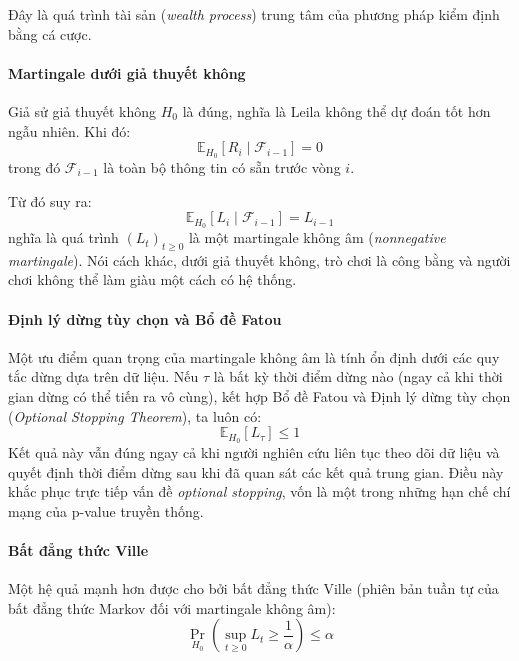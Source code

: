 Đây là quá trình tài sản (\textit{wealth process}) trung tâm của phương pháp kiểm định bằng cá cược.

\paragraph{Martingale dưới giả thuyết không}

Giả sử giả thuyết không $H_0$ là đúng, nghĩa là Leila không thể dự đoán tốt hơn ngẫu nhiên. Khi đó:
\begin{equation}
    \mathbb{E}_{H_0}[R_i \mid \mathcal{F}_{i-1}] = 0
\end{equation}
trong đó $\mathcal{F}_{i-1}$ là toàn bộ thông tin có sẵn trước vòng $i$.

Từ đó suy ra:
\begin{equation}
    \mathbb{E}_{H_0} [ L_i \mid \mathcal{F}_{i-1} ] = L_{i-1}
\end{equation}
nghĩa là quá trình $(L_t)_{t\ge0}$ là một martingale không âm (\textit{nonnegative martingale}). Nói cách khác, dưới giả thuyết không, trò chơi là công bằng và người chơi không thể làm giàu một cách có hệ thống.

\paragraph{Định lý dừng tùy chọn và Bổ đề Fatou}

Một ưu điểm quan trọng của martingale không âm là tính ổn định dưới các quy tắc dừng dựa trên dữ liệu. Nếu $\tau$ là bất kỳ thời điểm dừng nào (ngay cả khi thời gian dừng có thể tiến ra vô cùng), kết hợp Bổ đề Fatou và Định lý dừng tùy chọn (\textit{Optional Stopping Theorem}), ta luôn có:
\begin{equation}
    \mathbb{E}_{H_0}[L_\tau] \leq 1
\end{equation}
Kết quả này vẫn đúng ngay cả khi người nghiên cứu liên tục theo dõi dữ liệu và quyết định thời điểm dừng sau khi đã quan sát các kết quả trung gian. Điều này khắc phục trực tiếp vấn đề \textit{optional stopping}, vốn là một trong những hạn chế chí mạng của p-value truyền thống.

\paragraph{Bất đẳng thức Ville}

Một hệ quả mạnh hơn được cho bởi bất đẳng thức Ville (phiên bản tuần tự của bất đẳng thức Markov đối với martingale không âm):
\begin{equation}
    \Pr_{H_0} \left( \sup_{t\ge 0} L_t \ge \frac{1}{\alpha} \right) \le \alpha
\end{equation}


